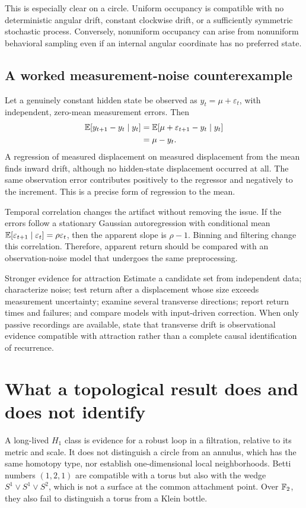 This is especially clear on a circle. Uniform occupancy is compatible with no deterministic angular drift, constant clockwise drift, or a sufficiently symmetric stochastic process. Conversely, nonuniform occupancy can arise from nonuniform behavioral sampling even if an internal angular coordinate has no preferred state.

\subsection{A worked measurement-noise counterexample}
Let a genuinely constant hidden state be observed as \(y_t=\mu+\varepsilon_t\), with independent, zero-mean measurement errors. Then
\begin{align}
\mathbb{E}[y_{t+1}-y_t\mid y_t]
&=\mathbb{E}[\mu+\varepsilon_{t+1}-y_t\mid y_t]\\
&=\mu-y_t.
\end{align}
A regression of measured displacement on measured displacement from the mean finds inward drift, although no hidden-state displacement occurred at all. The same observation error contributes positively to the regressor and negatively to the increment. This is a precise form of regression to the mean.

Temporal correlation changes the artifact without removing the issue. If the errors follow a stationary Gaussian autoregression with conditional mean \(\mathbb{E}[\varepsilon_{t+1}\mid\varepsilon_t]=\rho\varepsilon_t\), then the apparent slope is \(\rho-1\). Binning and filtering change this correlation. Therefore, apparent return should be compared with an observation-noise model that undergoes the same preprocessing.

\begin{insight}{Stronger evidence for attraction}
Estimate a candidate set from independent data; characterize noise; test return after a displacement whose size exceeds measurement uncertainty; examine several transverse directions; report return times and failures; and compare models with input-driven correction. When only passive recordings are available, state that transverse drift is observational evidence compatible with attraction rather than a complete causal identification of recurrence.
\end{insight}

\section{What a topological result does and does not identify}
A long-lived \(H_1\) class is evidence for a robust loop in a filtration, relative to its metric and scale. It does not distinguish a circle from an annulus, which has the same homotopy type, nor establish one-dimensional local neighborhoods. Betti numbers \((1,2,1)\) are compatible with a torus but also with the wedge \(S^1\vee S^1\vee S^2\), which is not a surface at the common attachment point. Over \(\mathbb{F}_2\), they also fail to distinguish a torus from a Klein bottle.

